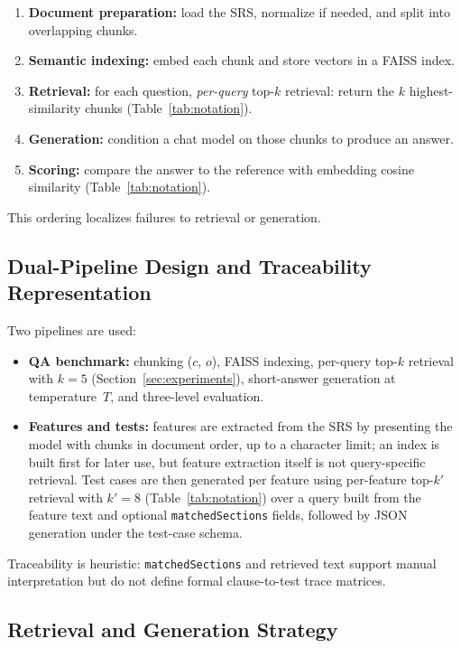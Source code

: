 \documentclass[conference]{IEEEtran}
\begin{document}
\begin{enumerate}
    \item \textbf{Document preparation:} load the SRS, normalize if needed, and split into overlapping chunks.
    \item \textbf{Semantic indexing:} embed each chunk and store vectors in a FAISS index.
    \item \textbf{Retrieval:} for each question, \emph{per-query} top-$k$ retrieval: return the $k$ highest-similarity chunks (Table~\ref{tab:notation}).
    \item \textbf{Generation:} condition a chat model on those chunks to produce an answer.
    \item \textbf{Scoring:} compare the answer to the reference with embedding cosine similarity (Table~\ref{tab:notation}).
\end{enumerate}

This ordering localizes failures to retrieval or generation.

\subsection{Dual-Pipeline Design and Traceability Representation}

Two pipelines are used:

\begin{itemize}
    \item \textbf{QA benchmark:} chunking ($c$, $o$), FAISS indexing, per-query top-$k$ retrieval with $k{=}5$ (Section~\ref{sec:experiments}), short-answer generation at temperature~$T$, and three-level evaluation.

    \item \textbf{Features and tests:} features are extracted from the SRS by presenting the model with chunks in document order, up to a character limit; an index is built first for later use, but feature extraction itself is not query-specific retrieval. Test cases are then generated per feature using per-feature top-$k'$ retrieval with $k'{=}8$ (Table~\ref{tab:notation}) over a query built from the feature text and optional \texttt{matchedSections} fields, followed by JSON generation under the test-case schema.
\end{itemize}

Traceability is heuristic: \texttt{matchedSections} and retrieved text support manual interpretation but do not define formal clause-to-test trace matrices.

\subsection{Retrieval and Generation Strategy}
\end{document}

